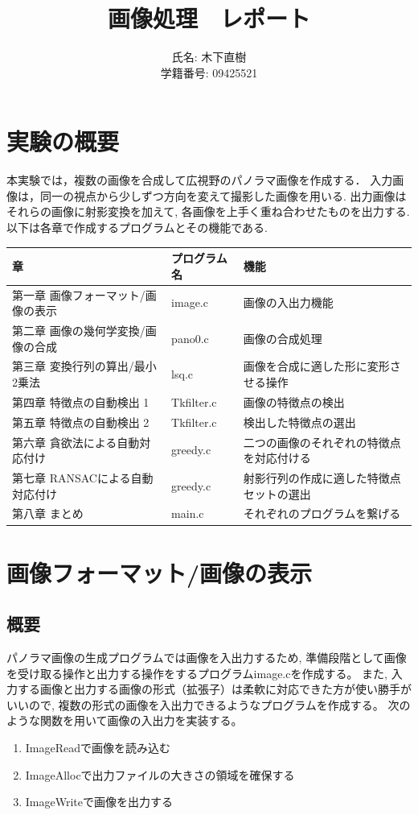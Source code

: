 \documentclass[a4j]{jarticle}
\title{画像処理　レポート}
\author{氏名: 木下直樹\\学籍番号: 09425521}
\begin{document}
\maketitle

\section*{実験の概要}
本実験では，複数の画像を合成して広視野のパノラマ画像を作成する． 入力画像は，同一の視点から少しずつ方向を変えて撮影した画像を用いる.
出力画像はそれらの画像に射影変換を加えて, 各画像を上手く重ね合わせたものを出力する. 
以下は各章で作成するプログラムとその機能である.

\begin{table}[htb]
\begin{tabular}{|l|l|l|}
\hline
章 & プログラム名 & 機能\\\hline
第一章 画像フォーマット/画像の表示 & image.c & 画像の入出力機能\\\hline
第二章 画像の幾何学変換/画像の合成 & pano0.c & 画像の合成処理\\\hline
第三章 変換行列の算出/最小2乗法 & lsq.c & 画像を合成に適した形に変形させる操作\\\hline
第四章 特徴点の自動検出 1 & Tkfilter.c & 画像の特徴点の検出\\\hline
第五章 特徴点の自動検出 2 & Tkfilter.c & 検出した特徴点の選出\\\hline
第六章 貪欲法による自動対応付け & greedy.c & 二つの画像のそれぞれの特徴点を対応付ける\\\hline
第七章 RANSACによる自動対応付け & greedy.c & 射影行列の作成に適した特徴点セットの選出\\\hline
第八章 まとめ & main.c & それぞれのプログラムを繋げる\\\hline

\end{tabular}
\end{table}

\section{画像フォーマット/画像の表示}
\subsection{概要}
パノラマ画像の生成プログラムでは画像を入出力するため, 準備段階として画像を受け取る操作と出力する操作をするプログラムimage.cを作成する。
また, 入力する画像と出力する画像の形式（拡張子）は柔軟に対応できた方が使い勝手がいいので, 
複数の形式の画像を入出力できるようなプログラムを作成する。
次のような関数を用いて画像の入出力を実装する。
\begin{enumerate}
\item ImageReadで画像を読み込む
\item ImageAllocで出力ファイルの大きさの領域を確保する
\item ImageWriteで画像を出力する
\end{enumerate}
\end{document}
